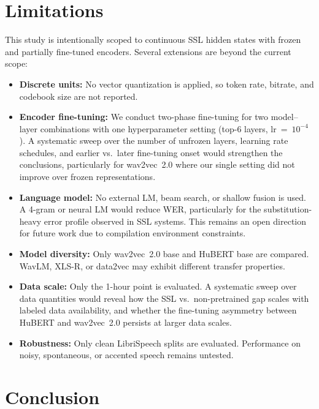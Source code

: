\documentclass{article}
\begin{document}
\section{Limitations}

This study is intentionally scoped to continuous SSL hidden states with frozen
and partially fine-tuned encoders. Several extensions are beyond the current
scope:
\begin{itemize}
\item \textbf{Discrete units:} No vector quantization is applied, so token rate,
  bitrate, and codebook size are not reported.
\item \textbf{Encoder fine-tuning:} We conduct two-phase fine-tuning for two
  model--layer combinations with one hyperparameter setting (top-6 layers,
  lr~=~$10^{-4}$). A systematic sweep over the number of unfrozen layers,
  learning rate schedules, and earlier vs.\ later fine-tuning onset would
  strengthen the conclusions, particularly for wav2vec~2.0 where our single
  setting did not improve over frozen representations.
\item \textbf{Language model:} No external LM, beam search, or shallow fusion is
  used. A 4-gram or neural LM would reduce WER, particularly for the
  substitution-heavy error profile observed in SSL systems. This remains an
  open direction for future work due to compilation environment constraints.
\item \textbf{Model diversity:} Only wav2vec~2.0 base and HuBERT base are
  compared. WavLM, XLS-R, or data2vec may exhibit different transfer properties.
\item \textbf{Data scale:} Only the 1-hour point is evaluated. A systematic
  sweep over data quantities would reveal how the SSL vs.\ non-pretrained gap
  scales with labeled data availability, and whether the fine-tuning asymmetry
  between HuBERT and wav2vec~2.0 persists at larger data scales.
\item \textbf{Robustness:} Only clean LibriSpeech splits are evaluated.
  Performance on noisy, spontaneous, or accented speech remains untested.
\end{itemize}

\section{Conclusion}
\end{document}
